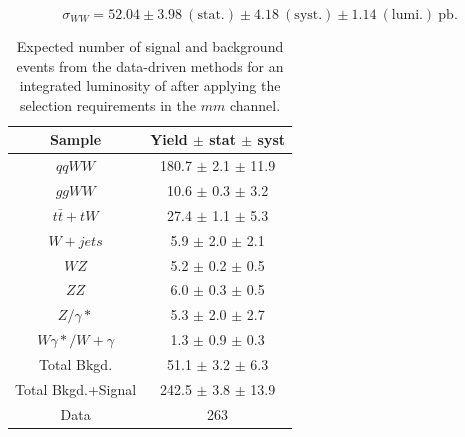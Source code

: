 \begin{equation*}
\sigma_{WW}  = 52.04 \pm 3.98~\mathrm{(stat.)} \pm 4.18~\mathrm{(syst.)} \pm 1.14~\mathrm{(lumi.)~pb}.
\end{equation*}

\begin{table}[ht!]
  \begin{center}
  \begin{tabular} {|c|c|}
\hline
Sample                & Yield $\pm$ stat $\pm$ syst \\ \hline \hline
$qqWW$                & 180.7 $\pm$  2.1 $\pm$ 11.9  \\ \hline
$ggWW$                & 10.6 $\pm$  0.3 $\pm$  3.2  \\ \hline
$t\bar{t} + tW$      & 27.4 $\pm$  1.1 $\pm$  5.3  \\ \hline
$W+jets$              &  5.9 $\pm$  2.0 $\pm$  2.1  \\ \hline
$WZ$             &  5.2 $\pm$  0.2 $\pm$  0.5  \\ \hline
$ZZ$             &  6.0 $\pm$  0.3 $\pm$  0.5  \\ \hline
$Z/\gamma*$          &  5.3 $\pm$  2.0 $\pm$  2.7  \\ \hline
$W\gamma*/W+\gamma$ &  1.3 $\pm$  0.9 $\pm$  0.3  \\ \hline \hline
Total Bkgd.           & 51.1 $\pm$  3.2 $\pm$  6.3  \\ \hline \hline
Total Bkgd.+Signal    & 242.5 $\pm$  3.8 $\pm$ 13.9  \\ \hline \hline
Data                  & 263 \\ \hline
\end{tabular}
  \caption{Expected number of signal and background events from the data-driven methods for
  an integrated luminosity of \intlumi after applying the selection requirements in the $mm$ channel.}
   \label{tab:data_yields_mm}
  \end{center}
\end{table}

